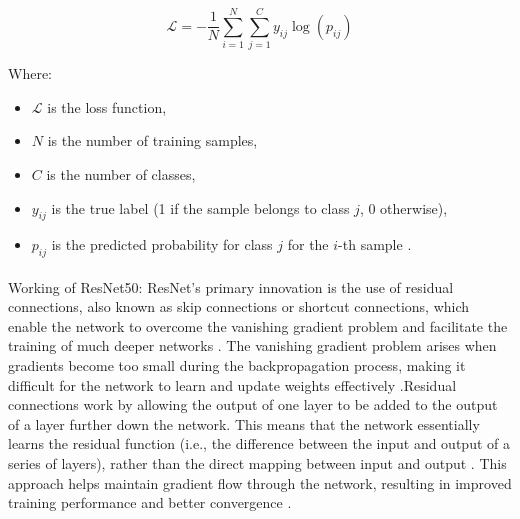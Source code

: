 \documentclass[12pt,a4paper]{article}
\begin{document}
\[
\mathcal{L} = -\frac{1}{N}\sum_{i=1}^{N}\sum_{j=1}^{C}y_{ij}\log(p_{ij})
\]

Where:
\begin{itemize}
\item $\mathcal{L}$ is the loss function,
\item $N$ is the number of training samples,
\item $C$ is the number of classes,
\item $y_{ij}$ is the true label (1 if the sample belongs to class $j$, 0 otherwise),
\item $p_{ij}$ is the predicted probability for class $j$ for the $i$-th sample \cite{DBLP:journals/corr/HeZRS15}.
\end{itemize}

\paragraph{} Working of ResNet50: ResNet's primary innovation is the use of residual connections, also known as skip connections or shortcut connections, which enable the network to overcome the vanishing gradient problem and facilitate the training of much deeper networks \cite{DBLP:journals/corr/HeZRS15}. The vanishing gradient problem arises when gradients become too small during the backpropagation process, making it difficult for the network to learn and update weights effectively \cite{DBLP:journals/corr/HeZRS15}.Residual connections work by allowing the output of one layer to be added to the output of a layer further down the network. This means that the network essentially learns the residual function (i.e., the difference between the input and output of a series of layers), rather than the direct mapping between input and output \cite{DBLP:journals/corr/HeZRS15}. This approach helps maintain gradient flow through the network, resulting in improved training performance and better convergence \cite{DBLP:journals/corr/HeZRS15}.
\end{document}
